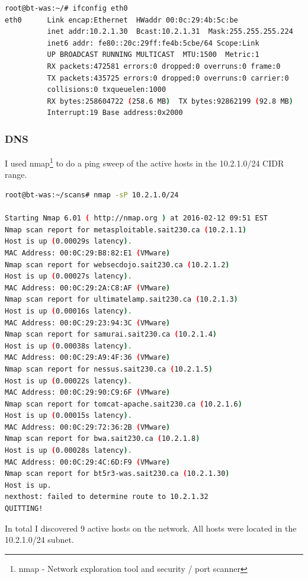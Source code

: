 \documentclass{article}
\begin{document}
\begin{lstlisting}[language=Bash, firstline=1, lastline=3]
root@bt-was:~/# ifconfig eth0
eth0      Link encap:Ethernet  HWaddr 00:0c:29:4b:5c:be  
          inet addr:10.2.1.30  Bcast:10.2.1.31  Mask:255.255.255.224
          inet6 addr: fe80::20c:29ff:fe4b:5cbe/64 Scope:Link
          UP BROADCAST RUNNING MULTICAST  MTU:1500  Metric:1
          RX packets:472581 errors:0 dropped:0 overruns:0 frame:0
          TX packets:435725 errors:0 dropped:0 overruns:0 carrier:0
          collisions:0 txqueuelen:1000 
          RX bytes:258604722 (258.6 MB)  TX bytes:92862199 (92.8 MB)
          Interrupt:19 Base address:0x2000 
\end{lstlisting}

\subsubsection{DNS}

I used nmap\footnote{\label{nmap}nmap - Network exploration tool and security / port scanner} 
to do a ping sweep of the active hosts in the 
10.2.1.0/24 CIDR range.

\begin{lstlisting}[language=Bash, firstline=1, lastline=1]
root@bt-was:~/scans# nmap -sP 10.2.1.0/24

Starting Nmap 6.01 ( http://nmap.org ) at 2016-02-12 09:51 EST
Nmap scan report for metasploitable.sait230.ca (10.2.1.1)
Host is up (0.00029s latency).
MAC Address: 00:0C:29:B8:82:E1 (VMware)
Nmap scan report for websecdojo.sait230.ca (10.2.1.2)
Host is up (0.00027s latency).
MAC Address: 00:0C:29:2A:C8:AF (VMware)
Nmap scan report for ultimatelamp.sait230.ca (10.2.1.3)
Host is up (0.00016s latency).
MAC Address: 00:0C:29:23:94:3C (VMware)
Nmap scan report for samurai.sait230.ca (10.2.1.4)
Host is up (0.00038s latency).
MAC Address: 00:0C:29:A9:4F:36 (VMware)
Nmap scan report for nessus.sait230.ca (10.2.1.5)
Host is up (0.00022s latency).
MAC Address: 00:0C:29:90:C9:6F (VMware)
Nmap scan report for tomcat-apache.sait230.ca (10.2.1.6)
Host is up (0.00015s latency).
MAC Address: 00:0C:29:72:36:2B (VMware)
Nmap scan report for bwa.sait230.ca (10.2.1.8)
Host is up (0.00028s latency).
MAC Address: 00:0C:29:4C:6D:F9 (VMware)
Nmap scan report for bt5r3-was.sait230.ca (10.2.1.30)
Host is up.
nexthost: failed to determine route to 10.2.1.32
QUITTING!
\end{lstlisting}

In total I discovered 9 active hosts on the network. All hosts were 
located in the 10.2.1.0/24 subnet.
\end{document}
